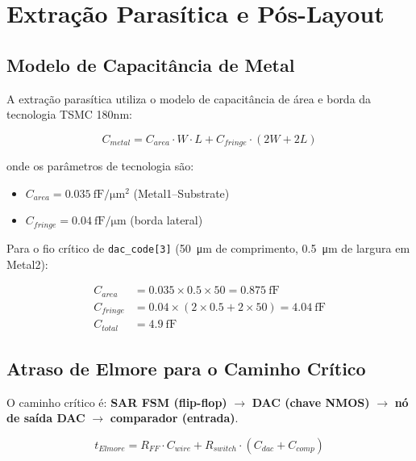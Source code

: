 \documentclass[12pt,a4paper]{article}
\begin{document}
\section{Extração Parasítica e Pós-Layout}
\label{sec:parasitica}

\subsection{Modelo de Capacitância de Metal}

A extração parasítica utiliza o modelo de capacitância de área e borda da
tecnologia TSMC 180nm:

\begin{equation}
  C_{metal} = C_{area} \cdot W \cdot L + C_{fringe} \cdot (2W + 2L)
\end{equation}

onde os parâmetros de tecnologia são:
\begin{itemize}
  \item $C_{area} = \SI{0.035}{\femto\farad\per\micro\meter\squared}$ (Metal1--Substrate)
  \item $C_{fringe} = \SI{0.04}{\femto\farad\per\micro\meter}$ (borda lateral)
\end{itemize}

Para o fio crítico de \texttt{dac\_code[3]} (\SI{50}{\micro\meter} de comprimento,
\SI{0.5}{\micro\meter} de largura em Metal2):

\begin{align}
  C_{area}  &= 0.035 \times 0.5 \times 50 = \SI{0.875}{\femto\farad} \nonumber \\
  C_{fringe} &= 0.04 \times (2 \times 0.5 + 2 \times 50) = \SI{4.04}{\femto\farad} \nonumber \\
  C_{total} &= \SI{4.9}{\femto\farad} \nonumber
\end{align}

\subsection{Atraso de Elmore para o Caminho Crítico}

O caminho crítico é: \textbf{SAR FSM (flip-flop)} $\to$ \textbf{DAC (chave NMOS)} $\to$
\textbf{nó de saída DAC} $\to$ \textbf{comparador (entrada)}.

\begin{equation}
  t_{Elmore} = R_{FF} \cdot C_{wire} + R_{switch} \cdot (C_{dac} + C_{comp})
\end{equation}
\end{document}
